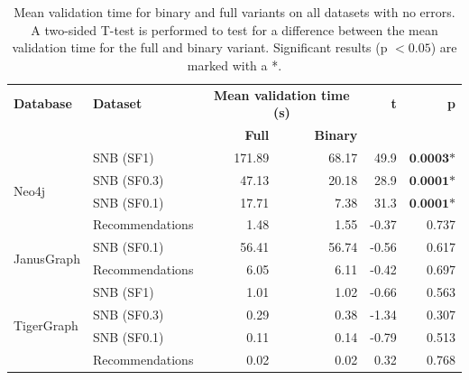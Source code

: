 \documentclass{report}
\theoremstyle{definition}
\begin{document}
\begin{table}[t]
  \centering
  \begin{tabular}{llrrrr}
    \hline
    \textbf{Database}           & \textbf{Dataset} & \multicolumn{2}{c}{\textbf{Mean validation time (s)}} & \textbf{t}      & \textbf{p}                      \\
                                &                  & \textbf{Full}                                         & \textbf{Binary} &            &                    \\
    \hline
    \multirow{4}{*}{Neo4j}      & SNB (SF1)        & 171.89                                                & 68.17           & 49.9       & $\textbf{0.0003*}$ \\
                                & SNB (SF0.3)      & 47.13                                                 & 20.18           & 28.9       & $\textbf{0.0001*}$ \\
                                & SNB (SF0.1)      & 17.71                                                 & 7.38            & 31.3       & $\textbf{0.0001*}$ \\
                                & Recommendations  & 1.48                                                  & 1.55            & -0.37      & 0.737              \\
    \hline
    \multirow{2}{*}{JanusGraph} & SNB (SF0.1)      & 56.41                                                 & 56.74           & -0.56      & 0.617              \\
                                & Recommendations  & 6.05                                                  & 6.11            & -0.42      & 0.697              \\
    \hline
    \multirow{4}{*}{TigerGraph} & SNB (SF1)        & 1.01                                                  & 1.02            & -0.66      & 0.563              \\
                                & SNB (SF0.3)      & 0.29                                                  & 0.38            & -1.34      & 0.307              \\
                                & SNB (SF0.1)      & 0.11                                                  & 0.14            & -0.79      & 0.513              \\
                                & Recommendations  & 0.02                                                  & 0.02            & 0.32       & 0.768              \\
    \hline
  \end{tabular}
  \caption[Mean validation time for binary and full variants]{Mean validation time for binary and full variants on all datasets with no errors. A two-sided T-test is performed to test for a difference between the mean validation time for the full and binary variant. Significant results (p $< 0.05$) are marked with a *.}
  \label{tab:results-variant}
\end{table}
\end{document}
